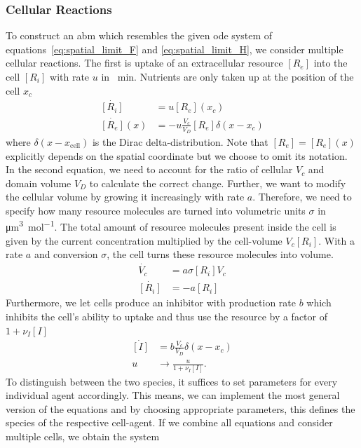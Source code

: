 \documentclass[10pt,A4paper]{article}
\numberwithin{equation}{section}
\begin{document}
\subsubsection{Cellular Reactions}
To construct an \ac{abm} which resembles the given \ac{ode} system of equations~\eqref{eq:spatial_limit_F} and \eqref{eq:spatial_limit_H}, we consider multiple cellular reactions.
The first is uptake of an extracellular resource $[R_e]$ into the cell $[R_i]$ with rate $u$ in \unit{\per\minute}.
Nutrients are only taken up at the position of the cell $x_c$
\begin{align}
    \dot{[R_i]} &= u [R_e](x_c)\\
    \dot{[R_e]}(x) &= -u \frac{V_c}{V_D} [R_e] \delta(x-x_c)
\end{align}
where $\delta(x-x_\text{cell})$ is the Dirac delta-distribution.
Note that $[R_e]=[R_e](x)$ explicitly depends on the spatial coordinate but we choose to omit its notation.
In the second equation, we need to account for the ratio of cellular $V_c$ and domain volume $V_D$ to calculate the correct change.
Further, we want to modify the cellular volume by growing it increasingly with rate $a$.
Therefore, we need to specify how many resource molecules are turned into volumetric units $\sigma$ in \unit{\micro\metre\cubed\per\mole}.
The total amount of resource molecules present inside the cell is given by the current concentration multiplied by the cell-volume $V_c [R_i]$.
With a rate $a$ and conversion $\sigma$, the cell turns these resource molecules into volume.
\begin{align}
    \dot{V_c} &= a\sigma [R_i] V_c\\
    \dot{[R_i]} &= - a[R_i]
\end{align}
Furthermore, we let cells produce an inhibitor with production rate $b$ which inhibits the cell's ability to uptake and thus use the resource by a factor of $1+\nu_I [I]$
\begin{align}
    \dot{[I]} &= b\frac{V_c}{V_D}\delta(x-x_c)\\
    u &\longrightarrow \frac{u}{1+\nu_I [I]}.
\end{align}
To distinguish between the two species, it suffices to set parameters for every individual agent accordingly.
This means, we can implement the most general version of the equations and by choosing appropriate parameters, this defines the species of the respective cell-agent.
If we combine all equations and consider multiple cells, we obtain the system
\end{document}
